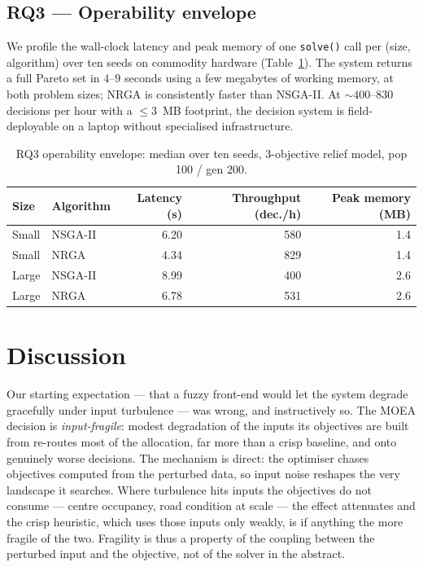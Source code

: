 \documentclass[systems,article,submit,moreauthors,pdftex]{Definitions/mdpi}
\begin{document}
\subsection{RQ3 --- Operability envelope}\label{sec:rq3}

We profile the wall-clock latency and peak memory of one \texttt{solve()} call per
(size, algorithm) over ten seeds on commodity hardware (Table~\ref{tab:rq3}). The system
returns a full Pareto set in $4$--$9$ seconds using a few megabytes of working memory, at
both problem sizes; NRGA is consistently faster than NSGA-II. At $\sim$$400$--$830$
decisions per hour with a $\le 3$~MB footprint, the decision system is field-deployable on
a laptop without specialised infrastructure.

\begin{table}[H]
\centering
\caption{RQ3 operability envelope: median over ten seeds, 3-objective relief model, pop 100
/ gen 200.\label{tab:rq3}}
\small
\begin{tabular}{llrrr}
\toprule
Size & Algorithm & Latency (s) & Throughput (dec./h) & Peak memory (MB)\\
\midrule
Small & NSGA-II & 6.20 & 580 & 1.4\\
Small & NRGA    & 4.34 & 829 & 1.4\\
Large & NSGA-II & 8.99 & 400 & 2.6\\
Large & NRGA    & 6.78 & 531 & 2.6\\
\bottomrule
\end{tabular}
\end{table}

\section{Discussion}\label{sec:discussion}

Our starting expectation --- that a fuzzy front-end would let the system degrade gracefully
under input turbulence --- was wrong, and instructively so. The MOEA decision is
\emph{input-fragile}: modest degradation of the inputs its objectives are built from re-routes
most of the allocation, far more than a crisp baseline, and onto genuinely worse decisions.
The mechanism is direct: the optimiser chases objectives computed from the perturbed data, so
input noise reshapes the very landscape it searches. Where turbulence hits inputs the
objectives do not consume --- centre occupancy, road condition at scale --- the effect
attenuates and the crisp heuristic, which uses those inputs only weakly, is if anything the
more fragile of the two. Fragility is thus a property of the coupling between the perturbed
input and the objective, not of the solver in the abstract.
\end{document}
